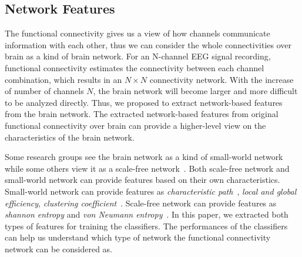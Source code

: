 \subsection{Network Features}
The functional connectivity gives us a view of how channels communicate information with each other, thus we can consider the whole connectivities over brain as a kind of brain network. For an N-channel EEG signal recording, functional connectivity estimates the connectivity between each channel combination, which results in an $N \times N$ connectivity network. With the increase of number of channels $N$, the brain network will become larger and more difficult to be analyzed directly. Thus, we proposed to extract network-based features from the brain network. The extracted network-based features from original functional connectivity over brain can provide a higher-level view on the characteristics of the brain network. 

Some research groups see the brain network as a kind of small-world network~\cite{bassett2006small} while some others view it as a scale-free network~\cite{eguiluz2005scale}. Both scale-free network and small-world network can provide features based on their own characteristics. Small-world network can provide features as \emph{characteristic path}~\cite{watts1998collective}, \emph{local and global efficiency}, \emph{clustering coefficient}~\cite{latora2001efficient}. Scale-free network can provide features as \emph{shannon entropy} and \emph{von Neumann entropy}~\cite{passerini2008neumann}. In this paper, we extracted both types of features for training the classifiers. The performances of the classifiers can help us understand which type of network the functional connectivity network can be considered as. 

